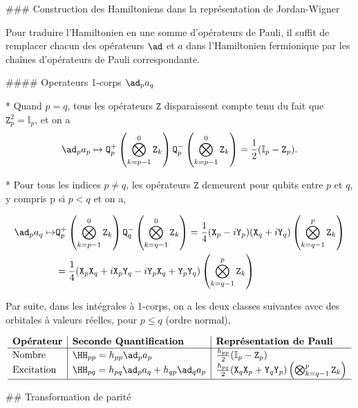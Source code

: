 \documentclass[12pt,a4paper]{article} %
\numberwithin{equation}{section} %
\numberwithin{figure}{section} %
\numberwithin{table}{section} %
\begin{document}
### Construction des Hamiltoniens dans la représentation de Jordan-Wigner

Pour traduire l'Hamiltonien en une somme d'opérateurs de Pauli, il suffit de remplacer chacun des opérateurs $\ad$ et $a$ dans l'Hamiltonien fermionique par les chaînes d'opérateurs de Pauli correspondante. 

#### Operateurs 1-corps $\ad_p a_q $

* Quand $p=q$, tous les opérateurs $\mathtt{Z}$ disparaissent compte tenu du fait que $\mathtt{Z}_p^2 = \mathbb{I}_p$, et on a 
  $$ \ad_p a_p \mapsto \mathtt{Q}^+_p \left(\bigotimes_{k=p-1}^0\mathtt{Z}_k\right)
  \mathtt{Q}^-_p \left(\bigotimes_{k=p-1}^0 \mathtt{Z}_k\right) = \frac12(\mathbb{I}_p-\mathtt{Z}_p).$$

* Pour tous les indices $p\neq q$, les opérateurs $\mathtt{Z}$ demeurent pour qubits entre $p$ et $q$, y compris p si $p < q$ et on a,
 
 \begin{align*} 
  \ad_p a_q \mapsto & \mathtt{Q}^+_p \left(\bigotimes_{k=p-1}^0\mathtt{Z}_k\right)
  \mathtt{Q}^-_q \left(\bigotimes_{k=q-1}^0 \mathtt{Z}_k\right)
  =\frac14(\mathtt{X}_p - i\mathtt{Y}_p)(\mathtt{X}_q + i\mathtt{Y}_q) \left(\bigotimes_{k=q-1}^p\mathtt{Z}_k\right)\\
  &=\frac14 (\mathtt{X}_p\mathtt{X}_q + i\mathtt{X}_p\mathtt{Y}_q
 - i\mathtt{Y}_p\mathtt{X}_q + \mathtt{Y}_p\mathtt{Y}_q ) \left(\bigotimes_{k=q-1}^p\mathtt{Z}_k\right)
\end{align*}

Par suite, dans les intégrales à 1-corps, on a les deux classes suivantes avec des orbitales à valeurs réelles, pour $p\leq q$ (ordre normal),

$$
\begin{array}{l|l|l}
\textbf{Opérateur} & \textbf{Seconde Quantification} &  \textbf{Représentation de Pauli} \\\hline
\text{Nombre} & \HH_{pp}=h_{pp}\ad_p a_p& \frac{h_{pp}}{2}(\mathbb{I}_p-\mathtt{Z}_p)\\
\text{Excitation}&\HH_{pq}=h_{pq}\ad_p a_q + h_{qp}  \ad_q a_p &\frac{h_{pq}}{2}(\mathtt{X}_q\mathtt{X}_p+\mathtt{Y}_q\mathtt{Y}_p)\left(\bigotimes_{k=q-1}^p\mathtt{Z}_k\right)\\\hline
\end{array}
$$

## Transformation de parité
\end{document}

